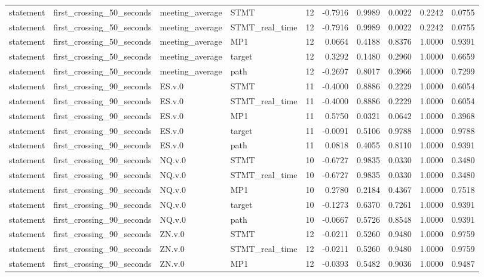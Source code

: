 \begin{tabular}{llllrrrrrr}
statement & first_crossing_50_seconds & meeting_average & STMT & 12 & -0.7916 & 0.9989 & 0.0022 & 0.2242 & 0.0755 \\
statement & first_crossing_50_seconds & meeting_average & STMT_real_time & 12 & -0.7916 & 0.9989 & 0.0022 & 0.2242 & 0.0755 \\
statement & first_crossing_50_seconds & meeting_average & MP1 & 12 & 0.0664 & 0.4188 & 0.8376 & 1.0000 & 0.9391 \\
statement & first_crossing_50_seconds & meeting_average & target & 12 & 0.3292 & 0.1480 & 0.2960 & 1.0000 & 0.6659 \\
statement & first_crossing_50_seconds & meeting_average & path & 12 & -0.2697 & 0.8017 & 0.3966 & 1.0000 & 0.7299 \\
statement & first_crossing_90_seconds & ES.v.0 & STMT & 11 & -0.4000 & 0.8886 & 0.2229 & 1.0000 & 0.6054 \\
statement & first_crossing_90_seconds & ES.v.0 & STMT_real_time & 11 & -0.4000 & 0.8886 & 0.2229 & 1.0000 & 0.6054 \\
statement & first_crossing_90_seconds & ES.v.0 & MP1 & 11 & 0.5750 & 0.0321 & 0.0642 & 1.0000 & 0.3968 \\
statement & first_crossing_90_seconds & ES.v.0 & target & 11 & -0.0091 & 0.5106 & 0.9788 & 1.0000 & 0.9788 \\
statement & first_crossing_90_seconds & ES.v.0 & path & 11 & 0.0818 & 0.4055 & 0.8110 & 1.0000 & 0.9391 \\
statement & first_crossing_90_seconds & NQ.v.0 & STMT & 10 & -0.6727 & 0.9835 & 0.0330 & 1.0000 & 0.3480 \\
statement & first_crossing_90_seconds & NQ.v.0 & STMT_real_time & 10 & -0.6727 & 0.9835 & 0.0330 & 1.0000 & 0.3480 \\
statement & first_crossing_90_seconds & NQ.v.0 & MP1 & 10 & 0.2780 & 0.2184 & 0.4367 & 1.0000 & 0.7518 \\
statement & first_crossing_90_seconds & NQ.v.0 & target & 10 & -0.1273 & 0.6370 & 0.7261 & 1.0000 & 0.9391 \\
statement & first_crossing_90_seconds & NQ.v.0 & path & 10 & -0.0667 & 0.5726 & 0.8548 & 1.0000 & 0.9391 \\
statement & first_crossing_90_seconds & ZN.v.0 & STMT & 12 & -0.0211 & 0.5260 & 0.9480 & 1.0000 & 0.9759 \\
statement & first_crossing_90_seconds & ZN.v.0 & STMT_real_time & 12 & -0.0211 & 0.5260 & 0.9480 & 1.0000 & 0.9759 \\
statement & first_crossing_90_seconds & ZN.v.0 & MP1 & 12 & -0.0393 & 0.5482 & 0.9036 & 1.0000 & 0.9487 \\

\end{tabular}
